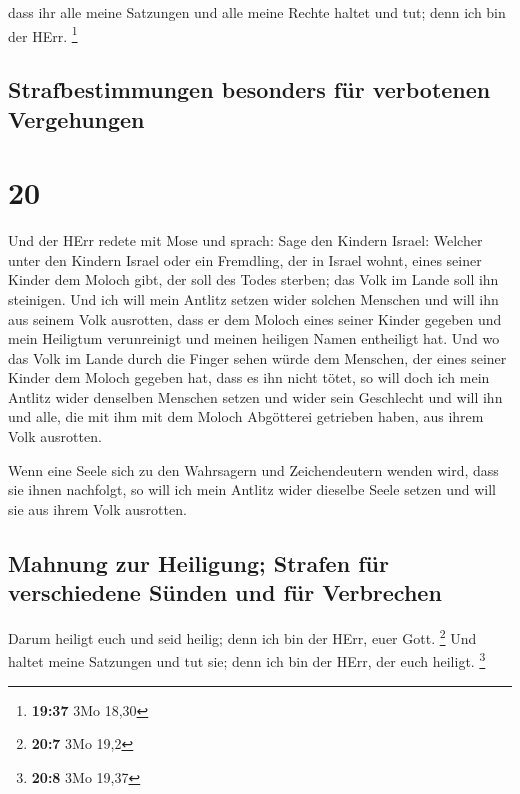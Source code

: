  dass ihr alle meine Satzungen und alle meine Rechte
haltet und tut; denn ich bin der HErr. \footnote{\textbf{19:37} 3Mo
  18,30}

\hypertarget{strafbestimmungen-besonders-fuxfcr-verbotenen-vergehungen}{%
\subsection{Strafbestimmungen besonders für verbotenen
Vergehungen}\label{strafbestimmungen-besonders-fuxfcr-verbotenen-vergehungen}}

\hypertarget{section-19}{%
\section{20}\label{section-19}}

 Und der HErr redete mit Mose und sprach: 
Sage den Kindern Israel: Welcher unter den Kindern Israel oder ein
Fremdling, der in Israel wohnt, eines seiner Kinder dem Moloch gibt, der
soll des Todes sterben; das Volk im Lande soll ihn steinigen.
 Und ich will mein Antlitz setzen wider solchen Menschen
und will ihn aus seinem Volk ausrotten, dass er dem Moloch eines seiner
Kinder gegeben und mein Heiligtum verunreinigt und meinen heiligen Namen
entheiligt hat.  Und wo das Volk im Lande durch die Finger
sehen würde dem Menschen, der eines seiner Kinder dem Moloch gegeben
hat, dass es ihn nicht tötet,  so will doch ich mein
Antlitz wider denselben Menschen setzen und wider sein Geschlecht und
will ihn und alle, die mit ihm mit dem Moloch Abgötterei getrieben
haben, aus ihrem Volk ausrotten.

 Wenn eine Seele sich zu den Wahrsagern und Zeichendeutern
wenden wird, dass sie ihnen nachfolgt, so will ich mein Antlitz wider
dieselbe Seele setzen und will sie aus ihrem Volk ausrotten.

\hypertarget{mahnung-zur-heiligung-strafen-fuxfcr-verschiedene-suxfcnden-und-fuxfcr-verbrechen}{%
\subsection{Mahnung zur Heiligung; Strafen für verschiedene Sünden und
für
Verbrechen}\label{mahnung-zur-heiligung-strafen-fuxfcr-verschiedene-suxfcnden-und-fuxfcr-verbrechen}}

 Darum heiligt euch und seid heilig; denn ich bin der
HErr, euer Gott. \footnote{\textbf{20:7} 3Mo 19,2}  Und
haltet meine Satzungen und tut sie; denn ich bin der HErr, der euch
heiligt. \footnote{\textbf{20:8} 3Mo 19,37}


